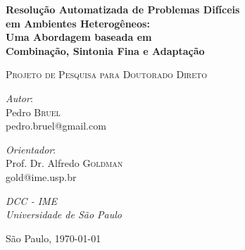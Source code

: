 \documentclass[a4paper, 12pt]{article}
\begin{document}
\hypersetup{backref,pdfpagemode=FullScreen,colorlinks=true}

\thispagestyle{empty}
\begin{center}
    \vspace*{4cm}
    \textbf{\Large{Resolução Automatizada de Problemas Difíceis \\ em Ambientes Heterogêneos: \\ Uma Abordagem baseada em \\ Combinação, Sintonia Fina e Adaptação}}\\

    \vskip 1cm

    \textsc{Projeto de Pesquisa para Doutorado Direto}

    \vskip 3cm

    \begin{minipage}{.4\linewidth}
        \begin{flushleft}
            \emph{Autor}: \\Pedro \textsc{Bruel}\\
            pedro.bruel@gmail.com
        \end{flushleft}
    \end{minipage}
    \begin{minipage}{.4\linewidth}
        \begin{flushright}
            \emph{Orientador}: \\Prof. Dr. Alfredo \textsc{Goldman}\\
            gold@ime.usp.br
        \end{flushright}
    \end{minipage}

    \vskip 1cm

    \normalsize{\emph{DCC - IME\\
    Universidade de São Paulo}\\}


    \vfill
    \normalsize{São Paulo, \today}
\end{center}

\newpage
\end{document}
